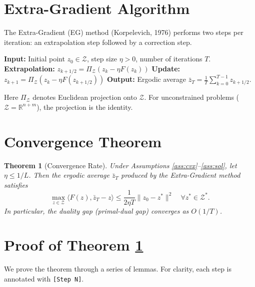 \documentclass{article}
\theoremstyle{plain}
\newtheorem{theorem}{Theorem}
\theoremstyle{definition}
\begin{document}
\section{Extra-Gradient Algorithm}
The Extra-Gradient (EG) method (Korpelevich, 1976) performs two steps per iteration: an extrapolation step followed by a correction step.

\begin{algorithm}[H]
\caption{Extra-Gradient Method}
\begin{algorithmic}
\STATE \textbf{Input:} Initial point $z_0 \in \mathcal{Z}$, step size $\eta > 0$, number of iterations $T$.
    \STATE \textbf{Extrapolation:} $z_{k+1/2} = \Pi_{\mathcal{Z}}(z_k - \eta F(z_k))$
    \STATE \textbf{Update:} $z_{k+1} = \Pi_{\mathcal{Z}}(z_k - \eta F(z_{k+1/2}))$
\ENDFOR
\STATE \textbf{Output:} Ergodic average $\bar{z}_T = \frac{1}{T}\sum_{k=0}^{T-1} z_{k+1/2}$.
\end{algorithmic}
\end{algorithm}
Here $\Pi_{\mathcal{Z}}$ denotes Euclidean projection onto $\mathcal{Z}$. For unconstrained problems ($\mathcal{Z} = \mathbb{R}^{n+m}$), the projection is the identity.

\section{Convergence Theorem}
\begin{theorem}[Convergence Rate] \label{thm:rate}
Under Assumptions \ref{ass:cvx}--\ref{ass:sol}, let $\eta \le 1/L$. Then the ergodic average $\bar{z}_T$ produced by the Extra-Gradient method satisfies
\[
\max_{z \in \mathcal{Z}} \langle F(z), \bar{z}_T - z \rangle \le \frac{1}{2\eta T} \|z_0 - z^*\|^2 \quad \forall z^* \in \mathcal{Z}^*.
\]
In particular, the duality gap (primal-dual gap) converges as $O(1/T)$.
\end{theorem}

\section{Proof of Theorem \ref{thm:rate}}
We prove the theorem through a series of lemmas. For clarity, each step is annotated with \texttt{[Step N]}.
\end{document}
